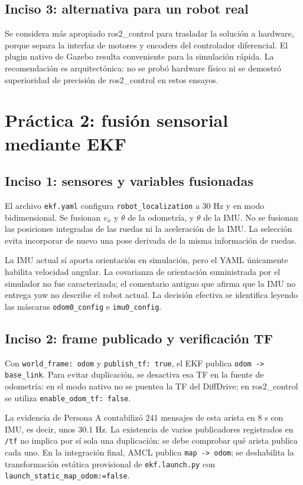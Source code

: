 \documentclass[11pt,a4paper]{article}
\newcommand{\archivo}[1]{\nolinkurl{#1}}
\begin{document}
\subsection{Inciso 3: alternativa para un robot real}
Se considera más apropiado ros2\_control para trasladar la solución a hardware, porque separa la interfaz de motores y encoders del controlador diferencial. El plugin nativo de Gazebo resulta conveniente para la simulación rápida. La recomendación es arquitectónica: no se probó hardware físico ni se demostró superioridad de precisión de ros2\_control en estos ensayos.

\section{Práctica 2: fusión sensorial mediante EKF}
\subsection{Inciso 1: sensores y variables fusionadas}
El archivo \archivo{ekf.yaml} configura \archivo{robot_localization} a 30 Hz y en modo bidimensional. Se fusionan $v_x$ y $\dot\theta$ de la odometría, y $\dot\theta$ de la IMU. No se fusionan las posiciones integradas de las ruedas ni la aceleración de la IMU. La selección evita incorporar de nuevo una pose derivada de la misma información de ruedas.

La IMU actual sí aporta orientación en simulación, pero el YAML únicamente habilita velocidad angular. La covarianza de orientación suministrada por el simulador no fue caracterizada; el comentario antiguo que afirma que la IMU no entrega yaw no describe el robot actual. La decisión efectiva se identifica leyendo las máscaras \archivo{odom0_config} e \archivo{imu0_config}.

\subsection{Inciso 2: frame publicado y verificación TF}
Con \archivo{world_frame: odom} y \archivo{publish_tf: true}, el EKF publica \archivo{odom -> base_link}. Para evitar duplicación, se desactiva esa TF en la fuente de odometría: en el modo nativo no se puentea la TF del DiffDrive; en ros2\_control se utiliza \archivo{enable_odom_tf: false}.

La evidencia de Persona A contabilizó 241 mensajes de esta arista en 8 s con IMU, es decir, unos 30.1 Hz. La existencia de varios publicadores registrados en \archivo{/tf} no implica por sí sola una duplicación: se debe comprobar qué arista publica cada uno. En la integración final, AMCL publica \archivo{map -> odom}; se deshabilita la transformación estática provisional de \archivo{ekf.launch.py} con \archivo{launch_static_map_odom:=false}.
\end{document}
